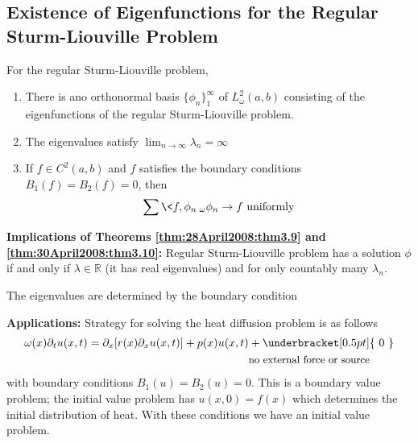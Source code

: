 \subsection{Existence of Eigenfunctions for the Regular Sturm-Liouville Problem}

\begin{thm}\label{thm:30April2008:thm3.10}
For the regular Sturm-Liouville problem,
\begin{enumerate}%
\item There is ano orthonormal basis $\{\phi_n\}^{\infty}_{1}$ of
$L^{2}_{\omega}(a,b)$ consisting of the eigenfunctions of
the regular Sturm-Liouville problem.
\item The eigenvalues satisfy  $\lim_{n\to\infty}\lambda_{n}=\infty$
\item If $f\in C^{2}(a,b)$ and $f$ satisfies the boundary
  conditions $B_1(f)=B_2(f)=0$, then
\begin{equation*}
\sum\<f,\phi_n\>_{\omega}\phi_{n}\to f\text{  uniformly}
\end{equation*}
\end{enumerate}
\end{thm}

\textbf{Implications of Theorems \eqref{thm:28April2008:thm3.9} and \eqref{thm:30April2008:thm3.10}:}
Regular Sturm-Liouville problem has a solution $\phi$ if and
only if $\lambda\in\mathbb{R}$ (it has real eigenvalues) and
for only countably many $\lambda_{n}$.

\begin{rmk}
The eigenvalues are determined by the boundary condition
\end{rmk}

\textbf{Applications:} Strategy for solving the heat
diffusion problem is as follows
\begin{align}
\omega(x)\partial_{t}u(x,t) =
\partial_{x}[r(x)\partial_{x}u(x,t)] + p(x)u(x,t) &+
\underbracket[0.5pt]{\text{ 0 }} \\
 & {\text{\small{no external force or source}}} \nonumber
\end{align}
with boundary conditions $B_{1}(u)=B_{2}(u)=0$. This is a
boundary value problem; the initial value problem has
$u(x,0)=f(x)$ which determines the initial distribution of
heat. With these conditions we have an initial value
problem.


